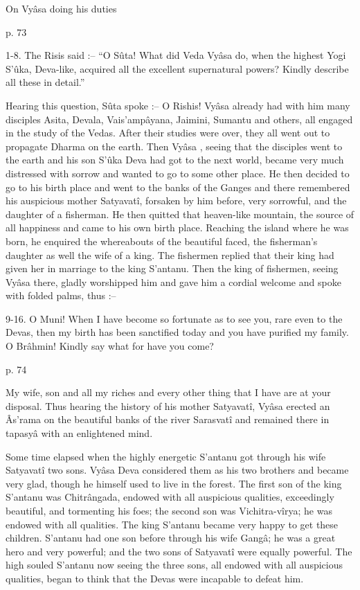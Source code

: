 On Vyâsa  doing his duties

 

p. 73

 

1-8. The Risis said :-- “O Sûta! What did Veda Vyâsa  do, when the highest Yogi S’ûka, Deva-like, acquired all the excellent supernatural powers? Kindly describe all these in detail.”

 

Hearing this question, Sûta spoke :-- O Rishis! Vyâsa  already had with him many disciples Asita, Devala, Vais'ampâyana, Jaimini, Sumantu and others, all engaged in the study of the Vedas. After their studies were over, they all went out to propagate Dharma on the earth. Then Vyâsa , seeing that the disciples went to the earth and his son S’ûka Deva had got to the next world, became very much distressed with sorrow and wanted to go to some other place. He then decided to go to his birth place and went to the banks of the Ganges and there remembered his auspicious mother Satyavatî, forsaken by him before, very sorrowful, and the daughter of a fisherman. He then quitted that heaven-like mountain, the source of all happiness and came to his own birth place. Reaching the island where he was born, he enquired the whereabouts of the beautiful faced, the fisherman's daughter as well the wife of a king. The fishermen replied that their king had given her in marriage to the king S'antanu. Then the king of fishermen, seeing Vyâsa there, gladly worshipped him and gave him a cordial welcome and spoke with folded palms, thus :--

 

9-16. O Muni! When I have become so fortunate as to see you, rare even to the Devas, then my birth has been sanctified today and you have purified my family. O Brâhmin! Kindly say what for have you come?

 

p. 74

 

My wife, son and all my riches and every other thing that I have are at your disposal. Thus hearing the history of his mother Satyavatî, Vyâsa  erected an Âs’rama on the beautiful banks of the river Sarasvatî and remained there in tapasyâ with an enlightened mind.

 

Some time elapsed when the highly energetic S’antanu got through his wife Satyavatî two sons. Vyâsa  Deva considered them as his two brothers and became very glad, though he himself used to live in the forest. The first son of the king S’antanu was Chitrângada, endowed with all auspicious qualities, exceedingly beautiful, and tormenting his foes; the second son was Vichitra-vîrya; he was endowed with all qualities. The king S’antanu became very happy to get these children. S’antanu had one son before through his wife Gangâ; he was a great hero and very powerful; and the two sons of Satyavatî were equally powerful. The high souled S’antanu now seeing the three sons, all endowed with all auspicious qualities, began to think that the Devas were incapable to defeat him.

